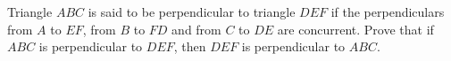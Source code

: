 Triangle $ABC$ is said to be perpendicular to triangle $DEF$ if the perpendiculars from $A$ to $EF$, from $B$ to $FD$ and from $C$ to $DE$ are concurrent. Prove that if $ABC$ is perpendicular to $DEF$, then $DEF$ is perpendicular to $ABC$.
